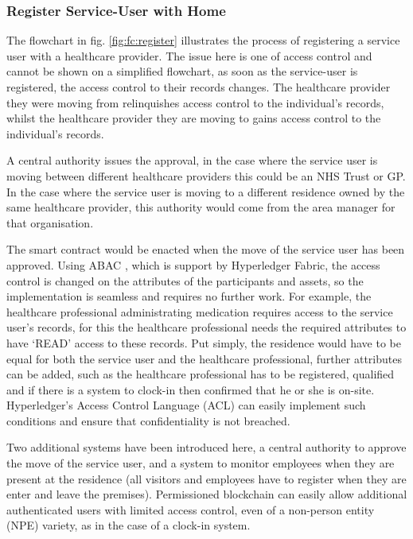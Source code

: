 \documentclass[runningheads]{llncs}
\begin{document}
\subsubsection{Register Service-User with Home}
The flowchart in fig. \ref{fig:fc:register} illustrates the process of registering a service user with a healthcare provider. The issue here is one of access control and cannot be shown on a simplified flowchart, as soon as the service-user is registered, the access control to their records changes. The healthcare provider they were moving from relinquishes access control to the individual's records, whilst the healthcare provider they are moving to gains access control to the individual's records. 

A central authority issues the approval, in the case where the service user is moving between different healthcare providers this could be an NHS Trust or GP. In the case where the service user is moving to a different residence owned by the same healthcare provider, this authority would come from the area manager for that organisation. 

The smart contract would be enacted when the move of the service user has been approved. Using ABAC \cite{nist:abac2014}, which is support by Hyperledger Fabric, the access control is changed on the attributes of the participants and assets, so the implementation is seamless and requires no further work. For example, the healthcare professional administrating medication requires access to the service user's records, for this the healthcare professional needs the required attributes to have `READ' access to these records. Put simply, the residence would have to be equal for both the service user and the healthcare professional, further attributes can be added, such as the healthcare professional has to be registered, qualified and if there is a system to clock-in then confirmed that he or she is on-site. Hyperledger's Access Control Language (ACL) can easily implement such conditions and ensure that confidentiality is not breached. 

Two additional systems have been introduced here, a central authority to approve the move of the service user, and a system to monitor employees when they are present at the residence (all visitors and employees have to register when they are enter and leave the premises). Permissioned blockchain can easily allow additional authenticated users with limited access control, even of a non-person entity (NPE) variety, as in the case of a clock-in system. 
\end{document}

